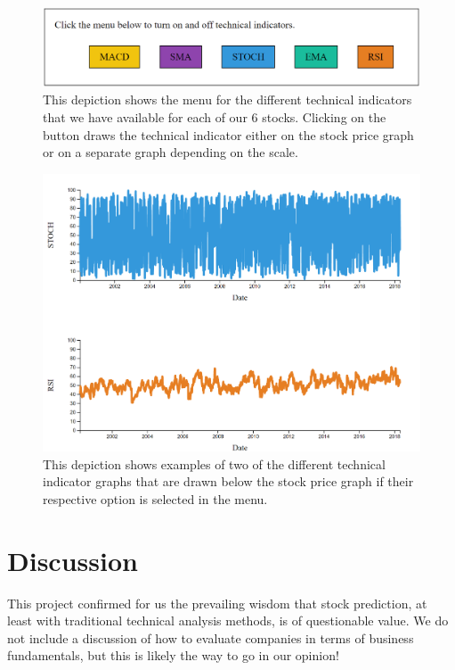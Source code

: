 \documentclass{vgtc}                          %
\begin{document}
\begin{figure}[h]
	\centering
	\includegraphics[scale=0.5]{vis2_menu}
	\caption{This depiction shows the menu for the different technical indicators that we have available for each of our 6 stocks.  Clicking on the button draws the technical indicator either on the stock price graph or on a separate graph depending on the scale.}
\end{figure}

\begin{figure}[h]
	\centering
	\includegraphics[scale=0.4]{vis2_1}
	\caption{This depiction shows examples of two of the different technical indicator graphs that are drawn below the stock price graph if their respective option is selected in the menu.}
\end{figure}

\section{Discussion}
This project confirmed for us the prevailing wisdom that stock prediction, at least with traditional technical analysis methods, is of questionable value. We do not include a discussion of how to evaluate companies in terms of business fundamentals, but this is likely the way to go in our opinion! 
\end{document}
